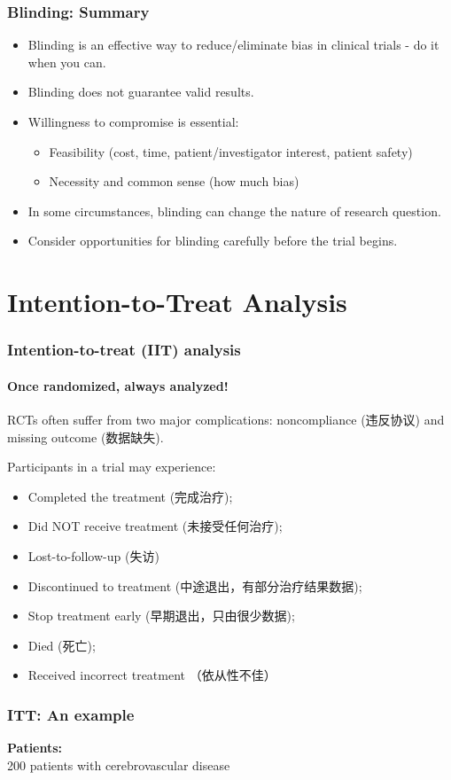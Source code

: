 \documentclass[table,10pt]{beamer}
\begin{document}
\begin{CJK*}{UTF8}{gbsn}
\begin{frame}[t]
\frametitle{Blinding: Summary}
\begin{itemize}[<+->]
	\item Blinding is an effective way to reduce/eliminate 
		bias in clinical trials - do it when you can.
	\item Blinding does not guarantee valid results.
	\item Willingness to compromise is essential:
	\begin{itemize}
		\item Feasibility (cost, time, patient/investigator 
			interest, patient safety)
		\item Necessity and common sense (how much bias)
	\end{itemize}
	\item In some circumstances, blinding can change the nature of 
		research question.
	\item Consider opportunities for blinding carefully before the 
		trial begins.
\end{itemize}
\end{frame}

\section{Intention-to-Treat Analysis}

\begin{frame}[t]
\frametitle{Intention-to-treat (IIT) analysis}
\framesubtitle{Once randomized, always analyzed!}
RCTs often suffer from two major complications: \alert{noncompliance (违反协议)} and 
\alert{missing outcome (数据缺失)}.

Participants in a trial may experience:
\begin{itemize}
	\item Completed the treatment (完成治疗);
	\item Did NOT receive treatment (未接受任何治疗);
	\item Lost-to-follow-up (失访)
	\item Discontinued to treatment (中途退出，有部分治疗结果数据);
	\item Stop treatment early (早期退出，只由很少数据);
	\item Died (死亡);
	\item Received incorrect treatment （依从性不佳）
\end{itemize}
\end{frame}

\begin{frame}[t]
\frametitle{ITT: An example}
\textbf{Patients: }\\
200 patients with cerebrovascular disease


\end{frame}
\end{CJK*}
\end{document}
